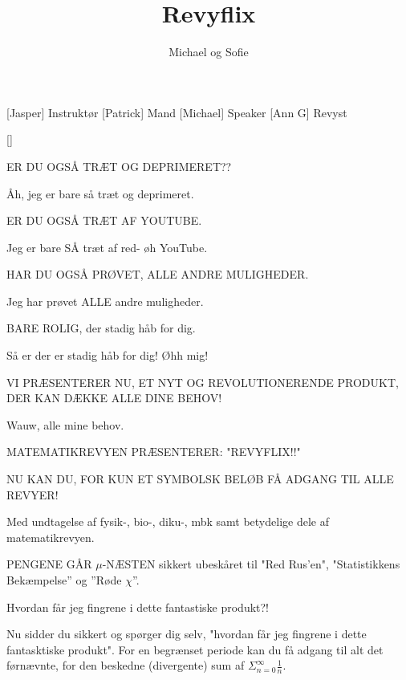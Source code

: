 \documentclass[a4paper,11pt]{article}
\title{Revyflix}
\author{Michael og Sofie}
\begin{document}
\maketitle

\begin{roles}
[Jasper] Instruktør
[Patrick] Mand
[Michael] Speaker
[Ann G] Revyst
\end{roles}

\begin{props}
[]
\end{props}
  
\begin{sketch}

 ER DU OGSÅ TRÆT OG DEPRIMERET??

 Åh, jeg er bare så træt og deprimeret.

 ER DU OGSÅ TRÆT AF YOUTUBE.

 Jeg er bare SÅ træt af red- øh YouTube.

 HAR DU OGSÅ PRØVET, ALLE ANDRE MULIGHEDER.

 Jeg har prøvet ALLE andre muligheder.

 BARE ROLIG, der stadig håb for dig.

 Så er der er stadig håb for dig! Øhh mig!

 VI PRÆSENTERER NU, ET NYT OG REVOLUTIONERENDE PRODUKT, DER KAN DÆKKE ALLE DINE BEHOV!

 Wauw, alle mine behov.

 MATEMATIKREVYEN  PRÆSENTERER: "REVYFLIX!!"


 NU KAN DU, FOR KUN ET SYMBOLSK BELØB FÅ ADGANG TIL ALLE REVYER!

 Med undtagelse af fysik-, bio-, diku-, mbk samt betydelige dele af matematikrevyen.

 PENGENE GÅR $\mu$-NÆSTEN sikkert ubeskåret til "Red Rus'en", "Statistikkens Bekæmpelse” og ”Røde $\chi$”.


 Hvordan får jeg fingrene i dette fantastiske produkt?!

 Nu sidder du sikkert og spørger dig selv, "hvordan får jeg fingrene i
dette fantasktiske produkt". For en begrænset periode kan du få adgang til alt
det førnævnte, for den beskedne (divergente) sum af $\Sigma_{n=0}^{\infty}
\frac{1}{n}$.


\end{sketch}
\end{document}
